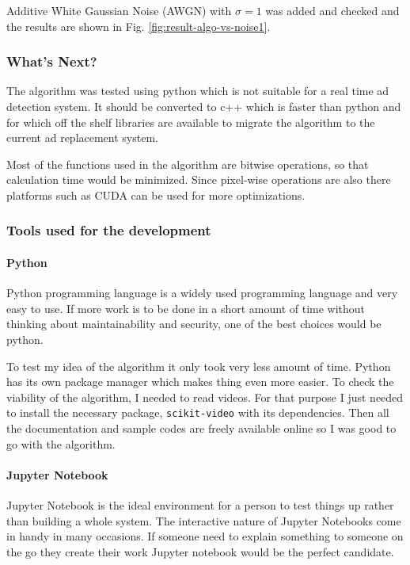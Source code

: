 Additive White Gaussian Noise (AWGN) with $\sigma=1$ was added and checked and the results are shown in Fig. \ref{fig:result-algo-vs-noise1}.



\subsubsection{What's Next?}
The algorithm was tested using python which is not suitable for a real time ad detection system. It should be converted to c++ which is faster than python and for which off the shelf libraries are available to migrate the algorithm to the current ad replacement system.

Most of the functions used in the algorithm are bitwise operations, so that calculation time would be minimized. Since pixel-wise operations are also there platforms such as CUDA can be used for more optimizations.

\subsubsection{Tools used for the development}

\paragraph{Python}

Python programming language is a widely used programming language and very easy to use. If more work is to be done in a short amount of time without thinking about maintainability and security, one of the best choices would be python. 

To test my idea of the algorithm it only took very less amount of time. Python has its own package manager which makes thing even more easier. To check the viability of the algorithm, I needed to read videos. For that purpose I just needed to install the necessary package, \texttt{scikit-video} with its dependencies. Then all the documentation and sample codes are freely available online so I was good to go with the algorithm.

\paragraph{Jupyter Notebook}

Jupyter Notebook is the ideal environment for a person to test things up rather than building a whole system. The interactive nature of Jupyter Notebooks come in handy in many occasions. If someone need to explain something to someone on the go they create their work Jupyter notebook would be the perfect candidate. 

